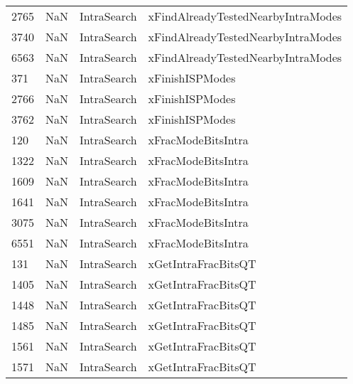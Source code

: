 \begin{tabular}{llll}
2765 &                   NaN &                IntraSearch &        xFindAlreadyTestedNearbyIntraModes \\
3740 &                   NaN &                IntraSearch &        xFindAlreadyTestedNearbyIntraModes \\
6563 &                   NaN &                IntraSearch &        xFindAlreadyTestedNearbyIntraModes \\
371  &                   NaN &                IntraSearch &                           xFinishISPModes \\
2766 &                   NaN &                IntraSearch &                           xFinishISPModes \\
3762 &                   NaN &                IntraSearch &                           xFinishISPModes \\
120  &                   NaN &                IntraSearch &                        xFracModeBitsIntra \\
1322 &                   NaN &                IntraSearch &                        xFracModeBitsIntra \\
1609 &                   NaN &                IntraSearch &                        xFracModeBitsIntra \\
1641 &                   NaN &                IntraSearch &                        xFracModeBitsIntra \\
3075 &                   NaN &                IntraSearch &                        xFracModeBitsIntra \\
6551 &                   NaN &                IntraSearch &                        xFracModeBitsIntra \\
131  &                   NaN &                IntraSearch &                       xGetIntraFracBitsQT \\
1405 &                   NaN &                IntraSearch &                       xGetIntraFracBitsQT \\
1448 &                   NaN &                IntraSearch &                       xGetIntraFracBitsQT \\
1485 &                   NaN &                IntraSearch &                       xGetIntraFracBitsQT \\
1561 &                   NaN &                IntraSearch &                       xGetIntraFracBitsQT \\
1571 &                   NaN &                IntraSearch &                       xGetIntraFracBitsQT \\

\end{tabular}
